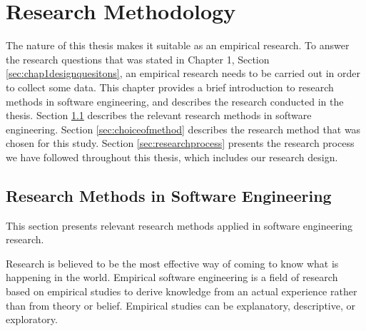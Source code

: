 
\chapter{Research Methodology}



The nature of this thesis makes it suitable as an empirical research. To answer the research questions that was stated in Chapter 1, Section \ref{sec:chap1designquesitons}, an empirical research needs to be carried out in order to collect some data. This chapter provides a brief introduction to research methods in software engineering, and describes the research conducted in the thesis. Section \ref{sec:researchmethodsinsoftwareengineering} describes the relevant research methods in software engineering. Section \ref{sec:choiceofmethod} describes the research method that was chosen for this study. Section \ref{sec:researchprocess} presents the research process we have followed throughout this thesis, which includes our research design.







\section{Research Methods in Software Engineering}
\label{sec:researchmethodsinsoftwareengineering}
 This section presents relevant research methods applied in software engineering research. 

 Research is believed to be the most effective way of coming to know what is happening in the world\cite{bassey2003case}. Empirical software engineering is a field of research based on empirical studies to derive knowledge from an actual experience rather than from theory or belief\cite{empirical-research-SE}. Empirical studies can be explanatory, descriptive, or exploratory\cite{Wohlin:2000:ESE:330775}. 

